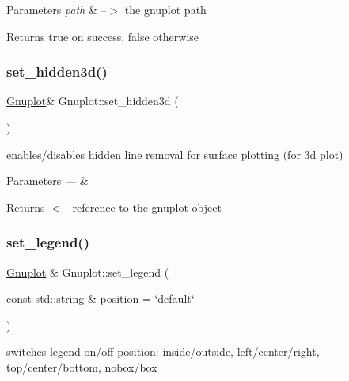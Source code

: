 \begin{DoxyParams}{Parameters}
{\em path} & --$>$ the gnuplot path\\
\hline
\end{DoxyParams}
\begin{DoxyReturn}{Returns}
true on success, false otherwise 
\end{DoxyReturn}
\mbox{\label{class_gnuplot_a891f9800705eddc3f73886f265c009b8}} 
\subsubsection{\texorpdfstring{set\+\_\+hidden3d()}{set\_hidden3d()}}
{\footnotesize\ttfamily \mbox{\hyperlink{class_gnuplot}{Gnuplot}}\& Gnuplot\+::set\+\_\+hidden3d (\begin{DoxyParamCaption}{ }\end{DoxyParamCaption})\hspace{0.3cm}{\ttfamily [inline]}}

enables/disables hidden line removal for surface plotting (for 3d plot)


\begin{DoxyParams}{Parameters}
{\em ---} & \\
\hline
\end{DoxyParams}
\begin{DoxyReturn}{Returns}
$<$-- reference to the gnuplot object 
\end{DoxyReturn}
\mbox{\label{class_gnuplot_ad64a717dac18167f656c4f09239973f8}} 
\subsubsection{\texorpdfstring{set\+\_\+legend()}{set\_legend()}}
{\footnotesize\ttfamily \mbox{\hyperlink{class_gnuplot}{Gnuplot}} \& Gnuplot\+::set\+\_\+legend (\begin{DoxyParamCaption}\item[{const std\+::string \&}]{position = {\ttfamily \char`\"{}default\char`\"{}} }\end{DoxyParamCaption})}

switches legend on/off position\+: inside/outside, left/center/right, top/center/bottom, nobox/box \mbox{\label{class_gnuplot_a67efc4d4dc46b6100d14ba2f7366ef11}} 
